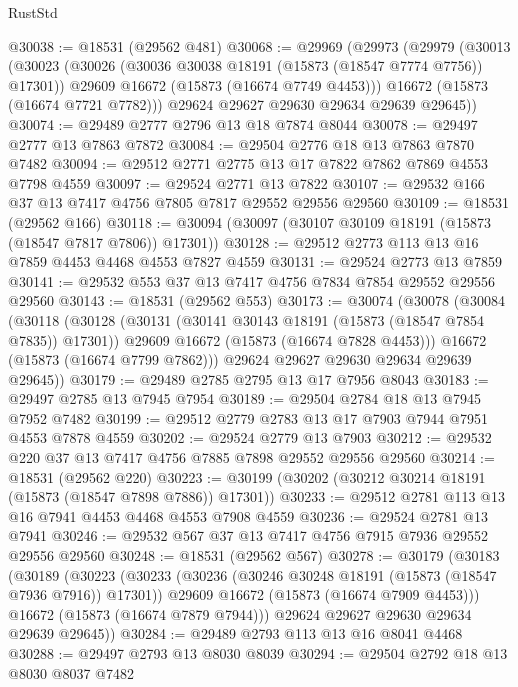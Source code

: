 \begin{lexlean}{RustStd}
\begin{coremodule}
@30038 := @18531 (@29562 @481)
@30068 := @29969
    (@29973
      (@29979
        (@30013
          (@30023
            (@30026 (@30036 @30038 @18191 (@15873 (@18547 @7774 @7756)) @17301))
            @29609
            @16672
            (@15873 (@16674 @7749 @4453)))
          @16672
          (@15873 (@16674 @7721 @7782)))
        @29624
        @29627
        @29630
        @29634
        @29639
        @29645))
@30074 := @29489 @2777 @2796 @13 @18 @7874 @8044
@30078 := @29497 @2777 @13 @7863 @7872
@30084 := @29504 @2776 @18 @13 @7863 @7870 @7482
@30094 := @29512 @2771 @2775 @13 @17 @7822 @7862 @7869 @4553 @7798 @4559
@30097 := @29524 @2771 @13 @7822
@30107 := @29532 @166 @37 @13 @7417 @4756 @7805 @7817 @29552 @29556 @29560
@30109 := @18531 (@29562 @166)
@30118 := @30094 (@30097 (@30107 @30109 @18191 (@15873 (@18547 @7817 @7806)) @17301))
@30128 := @29512 @2773 @113 @13 @16 @7859 @4453 @4468 @4553 @7827 @4559
@30131 := @29524 @2773 @13 @7859
@30141 := @29532 @553 @37 @13 @7417 @4756 @7834 @7854 @29552 @29556 @29560
@30143 := @18531 (@29562 @553)
@30173 := @30074
    (@30078
      (@30084
        (@30118
          (@30128
            (@30131 (@30141 @30143 @18191 (@15873 (@18547 @7854 @7835)) @17301))
            @29609
            @16672
            (@15873 (@16674 @7828 @4453)))
          @16672
          (@15873 (@16674 @7799 @7862)))
        @29624
        @29627
        @29630
        @29634
        @29639
        @29645))
@30179 := @29489 @2785 @2795 @13 @17 @7956 @8043
@30183 := @29497 @2785 @13 @7945 @7954
@30189 := @29504 @2784 @18 @13 @7945 @7952 @7482
@30199 := @29512 @2779 @2783 @13 @17 @7903 @7944 @7951 @4553 @7878 @4559
@30202 := @29524 @2779 @13 @7903
@30212 := @29532 @220 @37 @13 @7417 @4756 @7885 @7898 @29552 @29556 @29560
@30214 := @18531 (@29562 @220)
@30223 := @30199 (@30202 (@30212 @30214 @18191 (@15873 (@18547 @7898 @7886)) @17301))
@30233 := @29512 @2781 @113 @13 @16 @7941 @4453 @4468 @4553 @7908 @4559
@30236 := @29524 @2781 @13 @7941
@30246 := @29532 @567 @37 @13 @7417 @4756 @7915 @7936 @29552 @29556 @29560
@30248 := @18531 (@29562 @567)
@30278 := @30179
    (@30183
      (@30189
        (@30223
          (@30233
            (@30236 (@30246 @30248 @18191 (@15873 (@18547 @7936 @7916)) @17301))
            @29609
            @16672
            (@15873 (@16674 @7909 @4453)))
          @16672
          (@15873 (@16674 @7879 @7944)))
        @29624
        @29627
        @29630
        @29634
        @29639
        @29645))
@30284 := @29489 @2793 @113 @13 @16 @8041 @4468
@30288 := @29497 @2793 @13 @8030 @8039
@30294 := @29504 @2792 @18 @13 @8030 @8037 @7482

\end{coremodule}
\end{lexlean}
